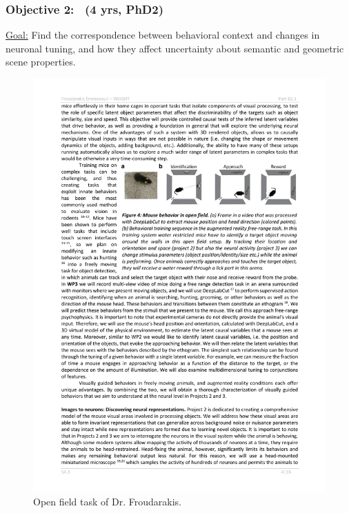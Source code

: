 \documentclass[COG,11pt]{ercgrant}
\begin{document}
\subsubsection{Objective 2:  \otwotitle~(4 yrs, PhD2)\hfill{}}
\underline{Goal:} Find the correspondence between behavioral context and changes in neuronal tuning, and how they affect uncertainty about semantic and geometric scene properties. 

\begin{figure}
\vspace{-2ex}
\includegraphics[width=\linewidth,trim=0 15 0 5, clip]{figures/openfield_ar.pdf}
\caption{Open field task of Dr. Froudarakis.}
\label{fig:openfield}
\end{figure}
\end{document}
